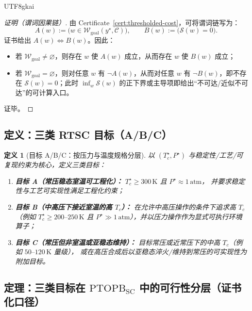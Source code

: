 \documentclass[12pt]{article}
\newtheorem{definition}{定义}[section]
\newcommand{\PTOPB}{\ensuremath{\mathrm{PTOPB}}}
\begin{document}
\begin{CJK*}{UTF8}{gkai}
\begin{proof}[证明（谓词因果链）]
由 Certificate~\ref{cert:thresholded-cost}，可将谓词链写为：
\[
A(w):=\bigl(w\in\mathcal{W}_{\mathrm{goal}}(y^\star,\mathcal{C})\bigr),\qquad
B(w):=\bigl(\mathcal{S}(w)=0\bigr).
\]
证书给出 $A(w)\Leftrightarrow B(w)$。因此：
\begin{itemize}
  \item 若 $\mathcal{W}_{\mathrm{goal}}\neq\varnothing$，则存在 $w$ 使 $A(w)$ 成立，从而存在 $w$ 使 $B(w)$ 成立；
  \item 若 $\mathcal{W}_{\mathrm{goal}}=\varnothing$，则对任意 $w$ 有 $\neg A(w)$，从而对任意 $w$ 有 $\neg B(w)$，即不存在 $\mathcal{S}(w)
    =0$；此时 $\inf_w\mathcal{S}(w)$ 的正下界或主导项即给出“不可达/近似不可达”的可计算入口。
\end{itemize}
证毕。
\end{proof}

\subsection{定义：三类 RTSC 目标（A/B/C）}

\begin{definition}[目标 A/B/C：按压力与温度规格分层]
\label{def:rtsc-targets}
以 $(T_c^\star,P^\star)$ 与稳定性/工艺/可复现约束为核心，定义三类目标：
\begin{enumerate}
  \item \textbf{目标 A（常压稳态室温可工程化）：} $T_c^\star\ge 300\,\mathrm{K}$ 且 $P^\star\approx 1\,\mathrm{atm}$，
    并要求稳定性与工艺可实现性满足工程化约束；
  \item \textbf{目标 B（中高压下接近室温的高 $T_c$）：} 在允许中高压操作的条件下追求高 $T_c$（例如 $T_c^\star\ge 200\text{--}250\,\mathrm{K}$ 且
    $P^\star\gg 1\,\mathrm{atm}$），并以压力操作作为显式可执行环境算子；
  \item \textbf{目标 C（常压但非室温或亚稳态维持）：} 目标常压或近常压下的中高 $T_c$（例如 $50\text{--}120\,\mathrm{K}$ 量级），
    或在高压合成后以亚稳态淬火/维持到常压的可实现性为附加目标。
\end{enumerate}
\end{definition}

\subsection{定理：三类目标在 \PTOPB$_{\mathrm{SC}}$ 中的可行性分层（证书化口径）}


\end{CJK*}
\end{document}
